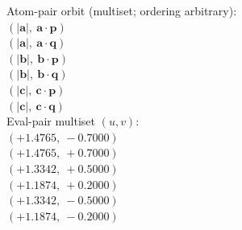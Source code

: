 \documentclass[a4paper,11pt]{article}
\newcommand{\vc}[1]{\ensuremath{\mathbf{#1}}}
\newcommand{\dnfagmiihhiejm}[1]{|\vc{#1}|}
\newcommand{\pdcegfomjfhook}[2]{\mathbf{#1} \cdot \mathbf{#2}}
\begin{document}
\quad Atom-pair orbit (multiset; ordering arbitrary):\\
$(\dnfagmiihhiejm{a},\ \pdcegfomjfhook{a}{p})$\\
$(\dnfagmiihhiejm{a},\ \pdcegfomjfhook{a}{q})$\\
$(\dnfagmiihhiejm{b},\ \pdcegfomjfhook{b}{p})$\\
$(\dnfagmiihhiejm{b},\ \pdcegfomjfhook{b}{q})$\\
$(\dnfagmiihhiejm{c},\ \pdcegfomjfhook{c}{p})$\\
$(\dnfagmiihhiejm{c},\ \pdcegfomjfhook{c}{q})$\\
\quad Eval-pair multiset $(u, v)$:\\
$(+1.4765,\ -0.7000)$\\
$(+1.4765,\ +0.7000)$\\
$(+1.3342,\ +0.5000)$\\
$(+1.1874,\ +0.2000)$\\
$(+1.3342,\ -0.5000)$\\
$(+1.1874,\ -0.2000)$\\
\end{document}
